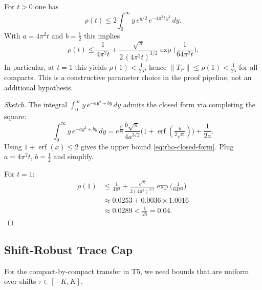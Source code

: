 \begin{lemma}\label{lem:rho-closed-form}
For $t > 0$ one has
\begin{equation}\label{eq:Prime-trace-closed-form-1}
  \rho(t) \leq 2 \int_0^{\infty} y \, e^{y/2} \, e^{-4\pi^2 t \, y^2} \, dy.
\end{equation}
With $a = 4\pi^2 t$ and $b = \tfrac{1}{2}$ this implies
\begin{equation}\label{eq:rho-closed-form}
  \rho(t) \leq \frac{1}{4\pi^2 t} + \frac{\sqrt{\pi}}{2 \, (4\pi^2 t)^{3/2}} \exp\!\Big(\frac{1}{64\pi^2 t}\Big).
\end{equation}
In particular, at $t = 1$ this yields $\rho(1) < \tfrac{1}{25}$, hence $\|T_P\| \leq \rho(1) < \tfrac{1}{25}$ for all compacts.
This is a constructive parameter choice in the proof pipeline, not an additional hypothesis.
\end{lemma}

\begin{proof}[Sketch]
The integral $\int_0^{\infty} y \, e^{-a y^2 + b y} \, dy$ admits the closed form via completing the square:
\begin{equation}
  \int_0^{\infty} y \, e^{-a y^2 + b y} \, dy = e^{\frac{b^2}{4a}} \frac{b\sqrt{\pi}}{4a^{3/2}} \bigl(1 + \operatorname{erf}(\tfrac{b}{2\sqrt{a}})\bigr) + \frac{1}{2a}.
\end{equation}
Using $1 + \operatorname{erf}(x) \leq 2$ gives the upper bound \eqref{eq:rho-closed-form}. Plug $a = 4\pi^2 t$, $b = \tfrac{1}{2}$ and simplify.

For $t = 1$:
\begin{align}
  \rho(1) &\leq \frac{1}{4\pi^2} + \frac{\sqrt{\pi}}{2(4\pi^2)^{3/2}} \exp\!\Big(\frac{1}{64\pi^2}\Big) \\
  &\approx 0.0253 + 0.0036 \times 1.0016 \\
  &\approx 0.0289 < \frac{1}{25} = 0.04.
\end{align}
\end{proof}

\subsection{Shift-Robust Trace Cap}

For the compact-by-compact transfer in T5, we need bounds that are uniform over shifts $\tau \in [-K, K]$.

